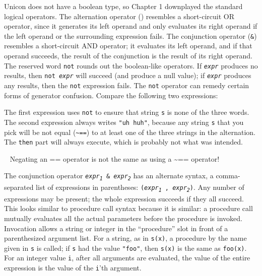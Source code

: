 Unicon does not have a boolean type, so
Chapter 1 downplayed the standard logical operators. The
alternation operator
(\texttt{{\textbar}}) resembles a short-circuit OR
operator, since it generates its left operand and only evaluates its
right operand if the left operand or the surrounding expression fails.
The conjunction operator (\texttt{\&}) resembles a short-circuit
AND operator; it evaluates its left operand,
and if that operand succeeds, the result of the conjunction is the
result of its right operand. The reserved word \texttt{not} rounds out
the boolean-like operators. If \texttt{\textit{expr}} produces no
results, then \texttt{not }\texttt{\textit{expr}} will
succeed (and produce a null value); if \texttt{\textit{expr}} produces
any results, then the \texttt{not} expression fails. The \texttt{not}
operator can remedy certain forms of generator confusion. Compare the
following two expressions:


The first expression uses \texttt{not} to ensure that string \texttt{s}
is none of the three words. The second expression always writes
\texttt{"uh huh"}, because any string
\texttt{s} that you pick will be not equal (\texttt{\~{}==}) to at
least one of the three strings in the alternation. The \texttt{then}
part will always execute, which is probably not what was intended.

\bigskip{}\
{\sffamily
Negating an == operator is not the same as using a \~{}== operator!}

The conjunction operator
\texttt{\textit{expr}}\texttt{\textit{\textsubscript{1}}}\texttt{ \&
}\texttt{\textit{expr}}\texttt{\textit{\textsubscript{2}}} has an
alternate syntax, a comma-separated list of expressions in parentheses:
\texttt{(}\texttt{\textit{expr}}\texttt{\textit{\textsubscript{1}}}\texttt{
, }\texttt{\textit{expr}}\texttt{\textit{\textsubscript{2}}}\texttt{)}.
Any number of expressions may be present; the whole expression
succeeds if they all succeed. This looks similar to procedure call syntax
because it is similar: a procedure call mutually
evaluates all the actual parameters before the procedure is invoked.
Invocation allows a string or integer in the ``procedure'' slot
in front of a parenthesized argument
list. For a string, as in
\texttt{s(x)}, a procedure by the name given in \texttt{s} is called;
if \texttt{s} had the value \texttt{"foo"},
then \texttt{s(x)} is the same as \texttt{foo(x)}. For an integer value
\texttt{i}, after all arguments are evaluated, the value of the entire
expression is the value of the \texttt{i}'th argument.

